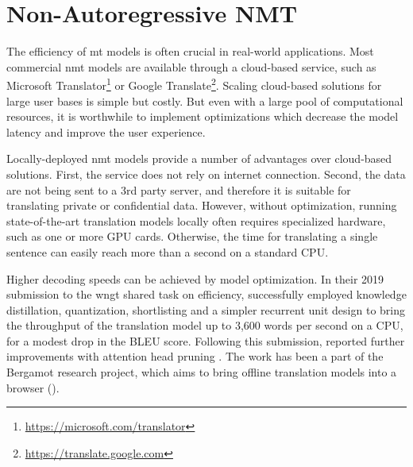 \chapter{Non-Autoregressive NMT}
\label{chap:nat}

The efficiency of \ac{mt} models is often crucial in real-world applications.
Most commercial \ac{nmt} models are available through a cloud-based service,
such as Microsoft Translator\footnote{\url{https://microsoft.com/translator}}
or Google Translate\footnote{\url{https://translate.google.com}}. Scaling
cloud-based solutions for large user bases is simple but costly. But even with
a large pool of computational resources, it is worthwhile to implement
optimizations which decrease the model latency and improve the user experience.


Locally-deployed \ac{nmt} models provide a number of advantages over
cloud-based solutions. First, the service does not rely on internet
connection. Second, the data are not being sent to a 3rd party server, and
therefore it is suitable for translating private or confidential data.
However, without optimization, running state-of-the-art translation models
locally often requires specialized hardware, such as one or more GPU
cards. Otherwise, the time for translating a single sentence can easily reach
more than a second on a standard CPU.

Higher decoding speeds can be achieved by model optimization. In their 2019
submission to the \ac{wngt} shared task on efficiency,
\citet{kim-etal-2019-research} successfully employed knowledge distillation,
quantization, shortlisting \citep{jean2015using} and a simpler recurrent unit
design to bring the throughput of the translation model up to 3,600 words per
second on a CPU, for a modest drop in the BLEU score. Following this
submission, \citet{bogoychev-etal-2020-edinburghs} reported further
improvements with attention head pruning \citep{voita-etal-2019-analyzing}. The
work has been a part of the Bergamot research project, which aims to bring
offline translation models into a browser ().


